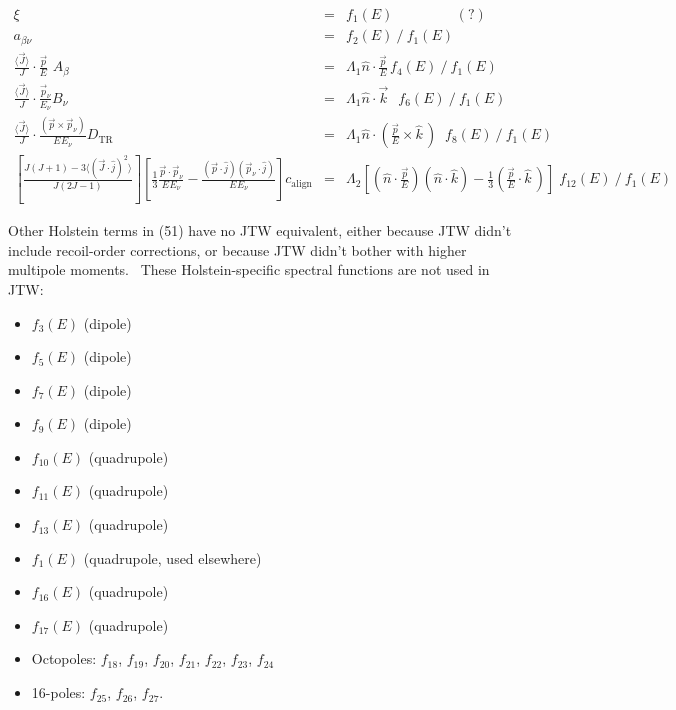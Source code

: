 \begin{eqnarray}
\xi          &=& f_1(E) \;\;\;\;\;\; \;\;\;\;\;\; \;\;\;\; (?) \\
a_{\beta\nu} &=& f_2(E) \: / \: f_1(E) \\
\frac{\langle\vec{J}\rangle}{J} \cdot \frac{\vec{p}}{E} \,\, A_\beta 
  &=& \Lambda_1 \hat{n}\cdot \frac{\vec{p}}{E} \, f_4(E) \:/\: f_1(E) \\
\frac{\langle\vec{J}\rangle}{J} \cdot \frac{\vec{p}_\nu}{E_\nu} B_\nu  
  &=& \Lambda_1 \hat{n} \cdot \vec{k} \;\;\, f_6(E) \:/\: f_1(E) \\
\frac{\langle\vec{J}\rangle}{J} \cdot \frac{\left( \vec{p} \times \vec{p}_\nu \right)}{E_{} E_\nu} D_{\mathrm{TR}} 
  &=& \Lambda_1 \hat{n} \cdot ( \frac{\vec{p}}{E} \times \hat{k} \,) \;\; f_8(E) \:/\: f_1(E) \\
\left[ \frac{J(J+1) - 3\langle (\vec{J}\cdot\hat{j})^2 \rangle}{J(2J-1)} \right] \!\!\!
\left[\frac{1}{3} \frac{\vec{p}\cdot\vec{p}_\nu }{E_{} E_\nu} - \frac{ (\vec{p}\cdot\hat{j}) (\vec{p}_\nu \cdot\hat{j} ) }{E_{} E_\nu} \right]c_{\mathrm{align}} 
  &=& \Lambda_2 \! \left[(\hat{n}\cdot\frac{\vec{p}}{E})(\hat{n}\cdot\hat{k})  - \frac{1}{3} (\frac{\vec{p}}{E}\cdot\hat{k} \,)\right] \; f_{12}(E) \:/\: f_1(E)
\end{eqnarray}

Other Holstein terms in (51) have no JTW equivalent, either because JTW didn't include recoil-order corrections, or because JTW didn't bother with higher multipole moments.  These Holstein-specific spectral functions are not used in JTW:

\begin{itemize}
	\item $f_{3}(E)$  (dipole)
	\item $f_{5}(E)$  (dipole)
	\item $f_{7}(E)$  (dipole)
	\item $f_{9}(E)$  (dipole)
	\item $f_{10}(E)$ (quadrupole)
	\item $f_{11}(E)$ (quadrupole)
	\item $f_{13}(E)$ (quadrupole)
	\item $f_{1}(E)$  (quadrupole, used elsewhere)
	\item $f_{16}(E)$ (quadrupole)
	\item $f_{17}(E)$ (quadrupole)
	\item Octopoles:  $f_{18}$, $f_{19}$, $f_{20}$, $f_{21}$, $f_{22}$, $f_{23}$, $f_{24}$
	\item 16-poles:   $f_{25}$, $f_{26}$, $f_{27}$.
\end{itemize}

